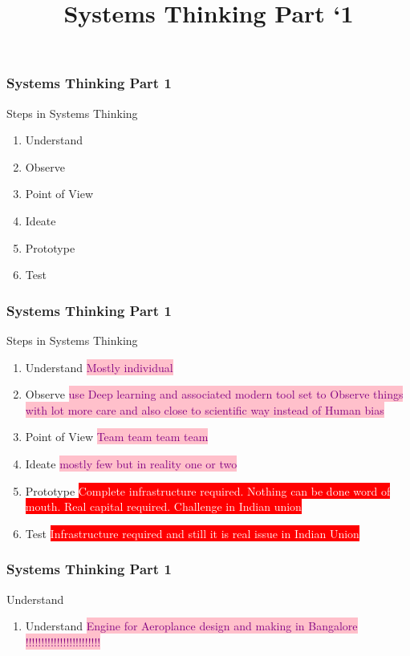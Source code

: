 

\title[Systems Engineering]{ Systems Thinking  Part `1 } 

\newpage
\begin{frame}
\frametitle{ Systems Thinking  Part 1 }
\begin{block}{ Steps in Systems Thinking}

\begin{enumerate}
    \item  Understand
    \item Observe
    \item Point of View
    \item Ideate
    \item Prototype
    \item Test
\end{enumerate}

\end{block}
\end{frame}


\newpage
\begin{frame}
\frametitle{ Systems Thinking  Part 1 }
\begin{block}{ Steps in Systems Thinking}

\begin{enumerate}
    \item  Understand   \colorbox{pink}{ \textcolor{purple}{ Mostly individual  } }
    \item Observe  \colorbox{pink}{ \textcolor{purple}{ use Deep learning and associated modern tool set to Observe things with lot more care and also close to scientific way instead of Human bias  } }
    \item Point of View  \colorbox{pink}{ \textcolor{purple}{  Team team team team } }
    \item Ideate  \colorbox{pink}{ \textcolor{purple}{ mostly few but in reality one or two} }
    \item Prototype  \colorbox{red}{ \textcolor{white}{ Complete  infrastructure required. Nothing can be done word of mouth. Real capital required. Challenge in Indian union } }
    \item Test  \colorbox{red}{ \textcolor{white}{ Infrastructure required and still it is real issue in Indian Union } }
\end{enumerate}

\end{block}
\end{frame}


\newpage
\begin{frame}
\frametitle{ Systems Thinking  Part 1}
\begin{block}{ Understand }

\begin{enumerate}[1]
    \item  Understand    \colorbox{pink}{ \textcolor{purple}{ Engine for Aeroplance design and making in Bangalore !!!!!!!!!!!!!!!!!!!!!!!!  } }
\end{enumerate}

\end{block}
\end{frame}


